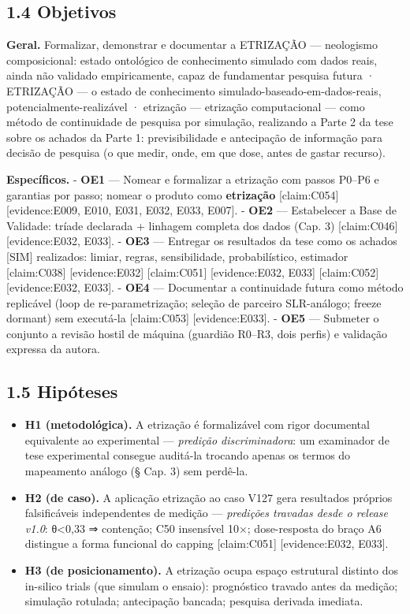 \documentclass[
  12pt,
]{report}
\providecommand{\tightlist}{%
  \setlength{\itemsep}{0pt}\setlength{\parskip}{0pt}}
\begin{document}
\hypertarget{objetivos}{%
\subsection{1.4 Objetivos}\label{objetivos}}

\textbf{Geral.} Formalizar, demonstrar e documentar a ETRIZAÇÃO ---
neologismo composicional: estado ontológico de conhecimento simulado com
dados reais, ainda não validado empiricamente, capaz de fundamentar
pesquisa futura · ETRIZAÇÃO --- o estado de conhecimento
simulado-baseado-em-dados-reais, potencialmente-realizável · etrização
--- etrização computacional --- como método de continuidade de pesquisa
por simulação, realizando a Parte 2 da tese sobre os achados da Parte 1:
previsibilidade e antecipação de informação para decisão de pesquisa (o
que medir, onde, em que dose, antes de gastar recurso).

\textbf{Específicos.} - \textbf{OE1} --- Nomear e formalizar a etrização
com passos P0--P6 e garantias por passo; nomear o produto como
\textbf{etrização} {[}claim:C054{]} {[}evidence:E009, E010, E031, E032,
E033, E007{]}. - \textbf{OE2} --- Estabelecer a Base de Validade: tríade
declarada + linhagem completa dos dados (Cap. 3) {[}claim:C046{]}
{[}evidence:E032, E033{]}. - \textbf{OE3} --- Entregar os resultados da
tese como os achados {[}SIM{]} realizados: limiar, regras,
sensibilidade, probabilístico, estimador {[}claim:C038{]}
{[}evidence:E032{]} {[}claim:C051{]} {[}evidence:E032, E033{]}
{[}claim:C052{]} {[}evidence:E032, E033{]}. - \textbf{OE4} ---
Documentar a continuidade futura como método replicável (loop de
re-parametrização; seleção de parceiro SLR-análogo; freeze dormant) sem
executá-la {[}claim:C053{]} {[}evidence:E033{]}. - \textbf{OE5} ---
Submeter o conjunto a revisão hostil de máquina (guardião R0--R3, dois
perfis) e validação expressa da autora.

\hypertarget{hipuxf3teses}{%
\subsection{1.5 Hipóteses}\label{hipuxf3teses}}

\begin{itemize}
\tightlist
\item
  \textbf{H1 (metodológica).} A etrização é formalizável com rigor
  documental equivalente ao experimental --- \emph{predição
  discriminadora}: um examinador de tese experimental consegue auditá-la
  trocando apenas os termos do mapeamento análogo (§ Cap. 3) sem
  perdê-la.
\item
  \textbf{H2 (de caso).} A aplicação etrização ao caso V127 gera
  resultados próprios falsificáveis independentes de medição ---
  \emph{predições travadas desde o release v1.0}: θ\textless0,33 ⇒
  contenção; C50 insensível 10×; dose-resposta do braço A6 distingue a
  forma funcional do capping {[}claim:C051{]} {[}evidence:E032, E033{]}.
\item
  \textbf{H3 (de posicionamento).} A etrização ocupa espaço estrutural
  distinto dos in-silico trials (que simulam o ensaio): prognóstico
  travado antes da medição; simulação rotulada; antecipação bancada;
  pesquisa derivada imediata.
\end{itemize}
\end{document}
